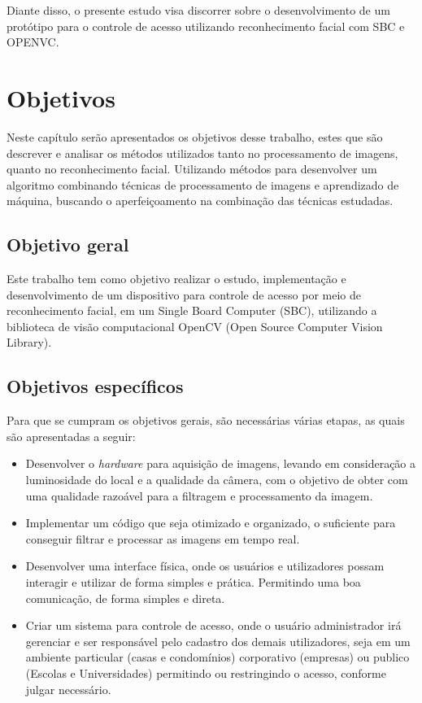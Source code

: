 Diante disso, o presente estudo visa discorrer sobre o desenvolvimento de um protótipo 
para o controle de acesso utilizando reconhecimento facial com SBC e OPENVC.

\section{Objetivos}\label{sec:objetivos}

Neste capítulo serão apresentados os objetivos desse trabalho, estes que são descrever
e analisar os métodos utilizados tanto no processamento de imagens, quanto no reconhecimento
facial. Utilizando métodos para desenvolver um algoritmo combinando técnicas de 
processamento de imagens e aprendizado de máquina, buscando o aperfeiçoamento na 
combinação das técnicas estudadas.

\subsection{Objetivo geral}\label{subsec:objetivoGeral}

Este trabalho tem como objetivo realizar o estudo, implementação e desenvolvimento 
de um dispositivo para controle de acesso por meio de reconhecimento facial, em um Single 
Board Computer (SBC), utilizando a biblioteca de visão computacional OpenCV (Open Source 
Computer Vision Library).

\subsection{Objetivos específicos}\label{subsec:objetivosEspecificos}

Para que se cumpram os objetivos gerais, são necessárias várias etapas, as quais são
apresentadas a seguir:

\begin{itemize}
    \item  Desenvolver o \textit{hardware} para aquisição de imagens, levando em 
    consideração a luminosidade do local e a qualidade da câmera, com o objetivo 
    de obter com uma qualidade razoável para a filtragem e processamento da imagem.
  
    \item Implementar um código que seja otimizado e organizado, o suficiente para 
    conseguir filtrar e processar as imagens em tempo real. 
    
    \item Desenvolver uma interface física, onde os usuários e utilizadores possam
    interagir e utilizar de forma simples e prática. Permitindo uma boa comunicação,
    de forma simples e direta. 
    
    \item Criar um sistema para controle de acesso, onde o usuário administrador
    irá gerenciar e ser responsável pelo cadastro dos demais utilizadores, seja 
    em um ambiente particular (casas e condomínios) corporativo (empresas) ou 
    publico (Escolas e Universidades) permitindo ou restringindo o acesso, 
    conforme julgar necessário. 
\end{itemize}

